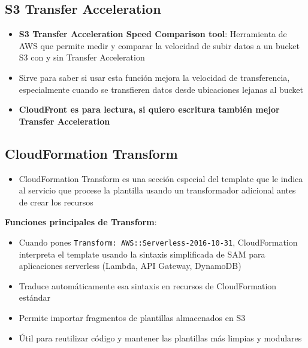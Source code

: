 \documentclass[12pt,a4paper]{report}
\newcommand{\important}[1]{\textcolor{dangerred}{\textbf{#1}}}
\begin{document}
\subsection{S3 Transfer Acceleration}

\begin{itemize}
    \item \textbf{S3 Transfer Acceleration Speed Comparison tool}: Herramienta de AWS que permite medir y comparar la velocidad de subir datos a un bucket S3 con y sin Transfer Acceleration
    \item Sirve para saber si usar esta función mejora la velocidad de transferencia, especialmente cuando se transfieren datos desde ubicaciones lejanas al bucket
    \item \important{CloudFront es para lectura, si quiero escritura también mejor Transfer Acceleration}
\end{itemize}

\subsection{CloudFormation Transform}

\begin{itemize}
    \item CloudFormation Transform es una sección especial del template que le indica al servicio que procese la plantilla usando un transformador adicional antes de crear los recursos
\end{itemize}

\textbf{Funciones principales de Transform}:

\begin{conceptbox}
\begin{itemize}
    \item Cuando pones \texttt{Transform: AWS::Serverless-2016-10-31}, CloudFormation interpreta el template usando la sintaxis simplificada de SAM para aplicaciones serverless (Lambda, API Gateway, DynamoDB)
    \item Traduce automáticamente esa sintaxis en recursos de CloudFormation estándar
\end{itemize}
\end{conceptbox}

\begin{awsbox}
\begin{itemize}
    \item Permite importar fragmentos de plantillas almacenados en S3
    \item Útil para reutilizar código y mantener las plantillas más limpias y modulares
\end{itemize}
\end{awsbox}
\end{document}
